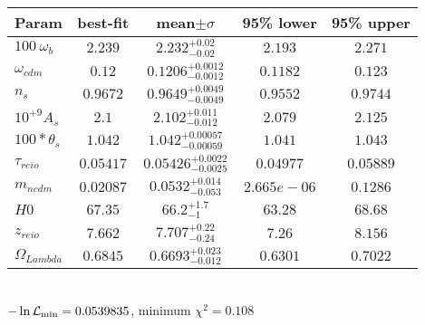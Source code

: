 \begin{tabular}{|l|c|c|c|c|} 
 \hline 
Param & best-fit & mean$\pm\sigma$ & 95\% lower & 95\% upper \\ \hline 
$100~\omega{}_{b }$ &$2.239$ & $2.232_{-0.02}^{+0.02}$ & $2.193$ & $2.271$ \\ 
$\omega{}_{cdm }$ &$0.12$ & $0.1206_{-0.0012}^{+0.0012}$ & $0.1182$ & $0.123$ \\ 
$n_{s }$ &$0.9672$ & $0.9649_{-0.0049}^{+0.0049}$ & $0.9552$ & $0.9744$ \\ 
$10^{+9}A_{s }$ &$2.1$ & $2.102_{-0.012}^{+0.011}$ & $2.079$ & $2.125$ \\ 
$100*\theta{}_{s }$ &$1.042$ & $1.042_{-0.00059}^{+0.00057}$ & $1.041$ & $1.043$ \\ 
$\tau{}_{reio }$ &$0.05417$ & $0.05426_{-0.0025}^{+0.0022}$ & $0.04977$ & $0.05889$ \\ 
$m_{ncdm }$ &$0.02087$ & $0.0532_{-0.053}^{+0.014}$ & $2.665e-06$ & $0.1286$ \\ 
$H0$ &$67.35$ & $66.2_{-1}^{+1.7}$ & $63.28$ & $68.68$ \\ 
$z_{reio }$ &$7.662$ & $7.707_{-0.24}^{+0.22}$ & $7.26$ & $8.156$ \\ 
$\Omega{}_{Lambda }$ &$0.6845$ & $0.6693_{-0.012}^{+0.023}$ & $0.6301$ & $0.7022$ \\ 
\hline 
 \end{tabular} \\ 
$-\ln{\cal L}_\mathrm{min} =0.0539835$, minimum $\chi^2=0.108$ \\ 
